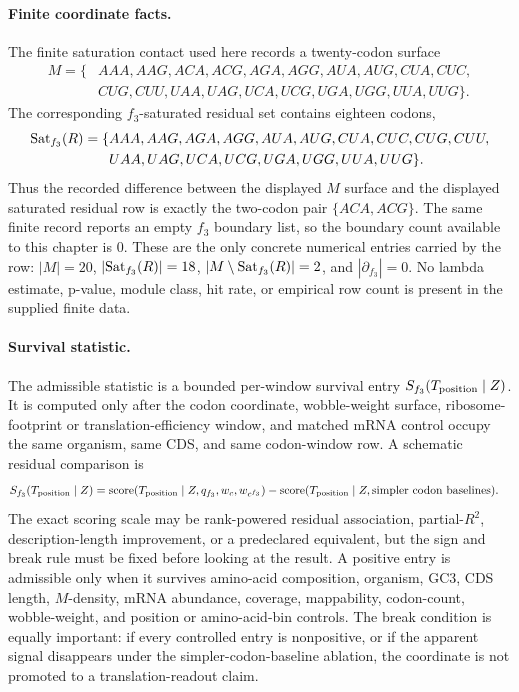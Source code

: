 \paragraph{Finite coordinate facts.}
The finite saturation contact used here records a twenty-codon surface
$$
\begin{aligned}
M=\{&AAA,AAG,ACA,ACG,AGA,AGG,AUA,AUG,CUA,CUC,\\
&CUG,CUU,UAA,UAG,UCA,UCG,UGA,UGG,UUA,UUG\}.
\end{aligned}
$$
The corresponding $f_3$-saturated residual set contains eighteen codons,
$$
\begin{aligned}
{\rm Sat}_{f_3}(R)=\{&AAA,AAG,AGA,AGG,AUA,AUG,CUA,CUC,CUG,CUU,\\
&UAA,UAG,UCA,UCG,UGA,UGG,UUA,UUG\}.
\end{aligned}
$$
Thus the recorded difference between the displayed $M$ surface and the displayed saturated residual row is exactly the two-codon pair $\{ACA,ACG\}$.  The same finite record reports an empty $f_3$ boundary list, so the boundary count available to this chapter is $0$.  These are the only concrete numerical entries carried by the row: $|M|=20$, $|{\rm Sat}_{f_3}(R)|=18$, $|M\setminus {\rm Sat}_{f_3}(R)|=2$, and $|\partial_{f_3}|=0$.  No lambda estimate, p-value, module class, hit rate, or empirical row count is present in the supplied finite data.

\paragraph{Survival statistic.}
The admissible statistic is a bounded per-window survival entry $S_{f_3}(T_{\rm position}\mid Z)$.  It is computed only after the codon coordinate, wobble-weight surface, ribosome-footprint or translation-efficiency window, and matched mRNA control occupy the same organism, same CDS, and same codon-window row.  A schematic residual comparison is
$$
\begin{aligned}
S_{f_3}(T_{\rm position}\mid Z)
  &= {\rm score}(T_{\rm position}\mid Z,q_{f_3},w_c,w_{c^{f_3}})
     - {\rm score}(T_{\rm position}\mid Z,\text{simpler codon baselines}).
\end{aligned}
$$
The exact scoring scale may be rank-powered residual association, partial-$R^2$, description-length improvement, or a predeclared equivalent, but the sign and break rule must be fixed before looking at the result.  A positive entry is admissible only when it survives amino-acid composition, organism, GC3, CDS length, $M$-density, mRNA abundance, coverage, mappability, codon-count, wobble-weight, and position or amino-acid-bin controls.  The break condition is equally important: if every controlled entry is nonpositive, or if the apparent signal disappears under the simpler-codon-baseline ablation, the coordinate is not promoted to a translation-readout claim.

